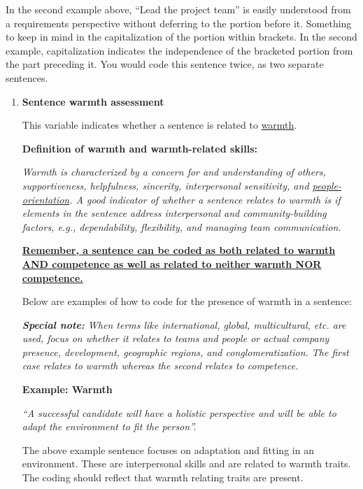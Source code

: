 \documentclass[jou]{apa7}
\begin{document}
\begin{enumerate}[label=\textbf{C\arabic*.}, wide=0pt, itemindent=0.25\textwidth]
\begin{adjustwidth}{0.75cm}{}
{        In the second example above, “Lead the project team” is easily understood from a requirements perspective without deferring to the portion before it. Something to keep in mind in the capitalization of the portion within brackets. In the second example, capitalization indicates the independence of the bracketed portion from the part preceding it. You would code this sentence twice, as two separate sentences.}
        \end{adjustwidth}
    \begin{enumerate}[label=\textbf{C\arabic{enumi}.\arabic*.}, wide=0pt]
        \item \noindent\textbf{Sentence warmth assessment}

        This variable indicates whether a sentence is related to \uline{warmth}.

        \noindent\textbf{Definition of warmth and warmth-related skills:}

        \textit{Warmth is characterized by a concern for and understanding of others, supportiveness, helpfulness, sincerity, interpersonal sensitivity, and \uline{people-orientation}. A good indicator of whether a sentence relates to warmth is if elements in the sentence address interpersonal and community-building factors, e.g., dependability, flexibility, and managing team communication.}

        \noindent\textbf{\uline{Remember, a sentence can be coded as both related to warmth AND competence as well as related to neither warmth NOR competence.}}

        \noindent Below are examples of how to code for the presence of warmth in a sentence:

        \noindent\textit{\textbf{Special note:} When terms like international, global, multicultural, etc. are used, focus on whether it relates to teams and people or actual company presence, development, geographic regions, and conglomeratization. The first case relates to warmth whereas the second relates to competence.}

        \noindent\textbf{\small Example: Warmth}

        \noindent\textit{\small “A successful candidate will have a holistic perspective and will be able to adapt the environment to fit the person”.}

        \begin{adjustwidth}{0.75cm}{}
            {\small The above example sentence focuses on adaptation and fitting in an environment. These are interpersonal skills and are related to warmth traits. The coding should reflect that warmth relating traits are present.}
            \end{adjustwidth}


\end{enumerate}
\end{enumerate}
\end{document}
